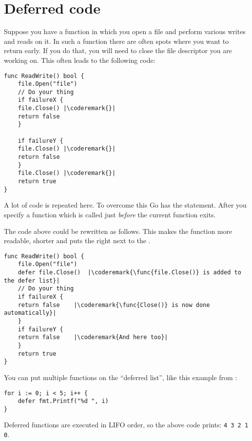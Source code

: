 \section{Deferred code}
\label{sec:deferred code}
Suppose you have a function in which you open a file and perform various
writes and reads on it. In such a function there are often spots where
you want to return early. If you do that, you will need to close the file
descriptor you are working on. This often leads to the following code:
\begin{lstlisting}[caption=Without defer]
func ReadWrite() bool {
    file.Open("file")
    // Do your thing
    if failureX {
	file.Close() |\coderemark{}|
	return false
    }

    if failureY {
	file.Close() |\coderemark{}|
	return false
    }
    file.Close() |\coderemark{}|
    return true
}
\end{lstlisting}
A lot of code is repeated here. To overcome this Go has the
 statement. After
 you specify a function which is called just \emph{before}
the current function exits.

The code above could be rewritten as follows. This makes the 
function more readable, shorter and puts the  right next 
to the .
\begin{lstlisting}[caption=With defer]
func ReadWrite() bool {
    file.Open("file")
    defer file.Close()	|\coderemark{\func{file.Close()} is added to the defer list}|
    // Do your thing
    if failureX {
	return false    |\coderemark{\func{Close()} is now done automatically}|
    }
    if failureY {
	return false    |\coderemark{And here too}|
    }
    return true
}
\end{lstlisting}
You can put multiple functions on the ``deferred list'', like this
example from \cite{effective_go}:
\begin{lstlisting}
for i := 0; i < 5; i++ { 
    defer fmt.Printf("%d ", i) 
} 
\end{lstlisting}
Deferred functions are executed in LIFO order, so the above code
prints: \lstinline{4 3 2 1 0}. 

